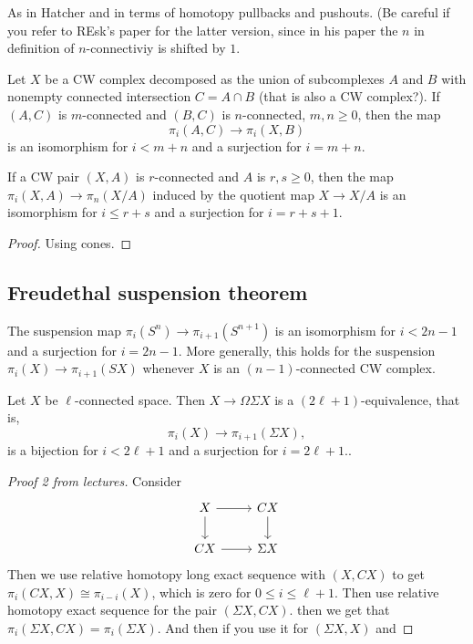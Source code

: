 \begin{remark}
As in Hatcher and in terms of homotopy pullbacks and pushouts. (Be careful if you refer to REsk's paper for the latter version, since in his paper the $n$ in definition of $n$-connectiviy is shifted by $1$.
\begin{thm}
	Let $X$ be a CW complex decomposed as the union of subcomplexes $A$ and $B$ with nonempty connected intersection $C=A\cap B$ {\color{magenta}(that is also a CW complex?)}. If $(A,C)$ is $m$-connected and $(B,C)$ is $n$-connected, $m,n\geq 0$, then the map
	\[\pi_{i}(A,C)\to \pi_{i}(X,B)\]
is an isomorphism for $i<m+n$ and a surjection for $i=m+n$.
\end{thm}

\begin{prop}
	If a CW pair $(X,A)$ is $r$-connected and $A$ is $r,s \geq 0$, then the map $\pi_{i}(X,A)\to \pi_{n}(X/A)$ induced by the quotient map $X\to X/A$ is an isomorphism for $i\leq r+s$ and a surjection for $i=r+s+1$.
\end{prop}
\begin{proof}
	Using cones.
\end{proof}

\subsection{Freudethal suspension theorem}

\begin{coro}
	The suspension map $\pi_{i}(S^{n})\to \pi_{i+1}(S^{n+1})$ is an isomorphism for $i<2n-1$ and a surjection for $i=2n-1$. More generally, this holds for the suspension $\pi_{i}(X)\to \pi_{i+1}(SX)$ whenever $X$ is an $(n-1)$-connected CW complex.
\end{coro}
\begin{thm}
		Let $X$ be $\ell$-connected space. Then $X\to\Omega\Sigma X$ is a $(2\ell+1)$-equivalence, that is,
	\[\pi_i(X)\to \pi_{i+1}(\Sigma X),\]
	is a bijection for $i<2\ell+1$ and a surjection for $i=2\ell+1$..
\end{thm}
\begin{proof}[Proof 2 from lectures]
	Consider
	\[\begin{tikzcd}
		X\arrow[r]\arrow[d]&CX\arrow[d]\\
		CX\arrow[r]&\Sigma X
	\end{tikzcd}\]
	Then we use relative homotopy long exact sequence with $(X,CX)$ to get $\pi_i(CX,X)\cong\pi_{i-i}(X)$, which is zero for $0\leq i\leq \ell+1$. Then use relative homotopy exact sequence for the pair $(\Sigma X,CX)$. then we get that $\pi_i(\Sigma X,CX)=\pi_i(\Sigma X)$. And then if you use it for $(\Sigma X, X)$ and 
	

\end{proof}
\end{remark}
